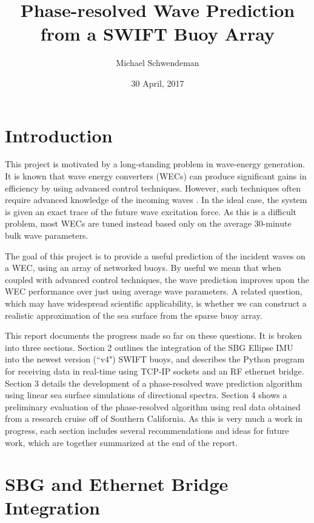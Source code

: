 \documentclass[11pt]{article}
\title{Phase-resolved Wave Prediction from a SWIFT Buoy Array}
\author{Michael Schwendeman}
\date{30 April, 2017}
\begin{document}
\maketitle
\section{Introduction}
This project is motivated by a long-standing problem in wave-energy generation.  It is known that wave energy converters (WECs) can produce significant gains in efficiency by using advanced control techniques.  However, such techniques often require advanced knowledge of the incoming waves \citep[see, for example,][]{Hals:2011}.  In the ideal case, the system is given an exact trace of the future wave excitation force.  As this is a difficult problem, most WECs are tuned instead based only on the average 30-minute bulk wave parameters. 

The goal of this project is to provide a useful prediction of the incident waves on a WEC, using an array of networked buoys.  By useful we mean that when coupled with advanced control techniques, the wave prediction improves upon the WEC performance over just using average wave parameters.
A related question, which may have widespread scientific applicability, is whether we can construct a realistic approximation of the sea surface from the sparse buoy array.

This report documents the progress made so far on these questions.  It is broken into three sections.  Section 2 outlines the integration of the SBG Ellipse IMU into the newest version (``v4") SWIFT buoys, and describes the Python program for receiving data in real-time using TCP-IP sockets and an RF ethernet bridge.  Section 3 details the development of a phase-resolved wave prediction algorithm using linear sea surface simulations of directional spectra.  Section 4 shows a preliminary evaluation of the phase-resolved algorithm using real data obtained from a research cruise off of Southern California.  As this is very much a work in progress, each section includes several recommendations and ideas for future work, which are together summarized at the end of the report.

\section{SBG and Ethernet Bridge Integration}
\end{document}

